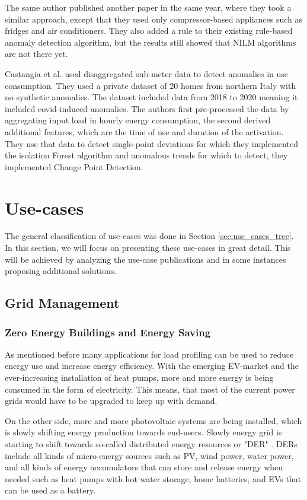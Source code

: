 The same author published another paper \cite{NILMAD22019} in the same year, where they took a similar approach, except that they used 
only compressor-based appliances such as fridges and air conditioners. They also added a rule to their existing rule-based anomaly 
detection algorithm, but the results still showed that NILM algorithms are not there yet. 

Castangia et al.\cite{Castangia2021} used disaggregated sub-meter data to detect anomalies in use consumption.
They used a private dataset of 20 homes from northern Italy with no synthetic anomalies. 
The dataset included data from 2018 to 2020 meaning it included covid-induced anomalies. 
The authors first pre-processed the data by aggregating input load in hourly energy consumption, 
the second derived additional features, which are the time of use and duration of the activation.
They use that data to detect single-point deviations for which they implemented the isolation Forest algorithm and
anomalous trends for which to detect, they implemented Change Point Detection. 

\section{Use-cases}
\label{sec:use-cases}

The general classification of use-cases was done in Section \ref{sec:use_cases_tree}. 
In this section, we will focus on presenting these use-cases in great detail.
This will be achieved by analyzing the use-case publications and in some instances proposing additional solutions.

\subsection{Grid Management}
\label{sec:grid_managment}
\subsubsection{Zero Energy Buildings and Energy Saving}

As mentioned before many applications for load profiling can be used to reduce energy use and increase energy efficiency. 
With the emerging EV-market and the ever-increasing installation of heat pumps, more and more energy is being consumed in the form of electricity. 
This means, that most of the current power grids would have to be upgraded to keep up with demand.

On the other side, more and more photovoltaic systems are being installed,
which is slowly shifting energy production towards end-users.
Slowly energy grid is starting to shift towards so-called distributed energy resources or "DER" \cite{MORENOJARAMILLO2021445}.
DERs include all kinds of micro-energy sources such as PV, wind power, water power, and all kinds of energy accumulators that can store 
and release energy when needed such as heat pumps with hot water storage, home batteries, and EVs that can be used as a battery.

